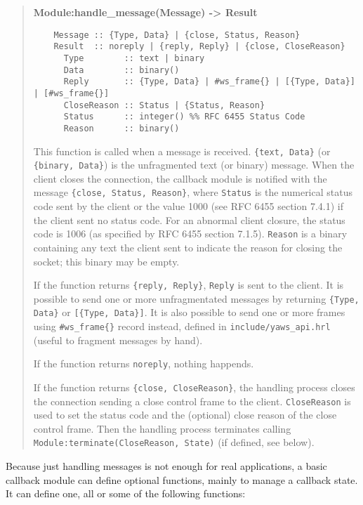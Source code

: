 \documentclass[11pt,oneside,english]{book}
\begin{document}
\begin{quote}
  \textbf{Module:handle\_message(Message) -> Result}
\begin{verbatim}
    Message :: {Type, Data} | {close, Status, Reason}
    Result  :: noreply | {reply, Reply} | {close, CloseReason}
      Type        :: text | binary
      Data        :: binary()
      Reply       :: {Type, Data} | #ws_frame{} | [{Type, Data}] | [#ws_frame{}]
      CloseReason :: Status | {Status, Reason}
      Status      :: integer() %% RFC 6455 Status Code
      Reason      :: binary()
\end{verbatim}

  This function is called when a message is received. \verb+{text, Data}+ (or
  \verb+{binary, Data}+) is the unfragmented text (or binary) message. When the
  client closes the connection, the callback module is notified with the message
  \verb+{close, Status, Reason}+, where \verb+Status+ is the numerical status
  code sent by the client or the value 1000 (see RFC 6455 section 7.4.1) if the
  client sent no status code. For an abnormal client closure, the status code is
  1006 (as specified by RFC 6455 section 7.1.5). \verb+Reason+ is a binary
  containing any text the client sent to indicate the reason for closing the
  socket; this binary may be empty.

  If the function returns \verb+{reply, Reply}+, \verb+Reply+ is sent to the
  client. It is possible to send one or more unfragmentated messages by
  returning \verb+{Type, Data}+ or \verb+[{Type, Data}]+. It is also possible to
  send one or more frames using \verb+#ws_frame{}+ record instead, defined in
  \verb+include/yaws_api.hrl+ (useful to fragment messages by hand).

  If the function returns \verb+noreply+, nothing happends.

  If the function returns \verb+{close, CloseReason}+, the handling process
  closes the connection sending a close control frame to the
  client. \verb+CloseReason+ is used to set the status code and the (optional)
  close reason of the close control frame. Then the handling process terminates
  calling \verb+Module:terminate(CloseReason, State)+ (if defined, see below).
\end{quote}


Because just handling messages is not enough for real applications, a basic
callback module can define optional functions, mainly to manage a callback
state. It can define one, all or some of the following functions:
\end{document}
